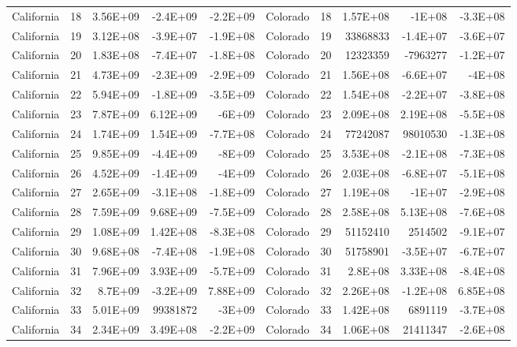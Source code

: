 \begin{table}[]
\begin{tabular}{lrrrrlrrrr}
		California &  18 & 3.56E+09 & -2.4E+09 & -2.2E+09 & Colorado &  18 & 1.57E+08 & -1E+08 & -3.3E+08 \\
		California &  19 & 3.12E+08 & -3.9E+07 & -1.9E+08 & Colorado &  19 & 33868833 & -1.4E+07 & -3.6E+07 \\
		California &  20 & 1.83E+08 & -7.4E+07 & -1.8E+08 & Colorado &  20 & 12323359 & -7963277 & -1.2E+07 \\
		California &  21 & 4.73E+09 & -2.3E+09 & -2.9E+09 & Colorado &  21 & 1.56E+08 & -6.6E+07 & -4E+08 \\
		California &  22 & 5.94E+09 & -1.8E+09 & -3.5E+09 & Colorado &  22 & 1.54E+08 & -2.2E+07 & -3.8E+08 \\
		California &  23 & 7.87E+09 & 6.12E+09 & -6E+09 & Colorado &  23 & 2.09E+08 & 2.19E+08 & -5.5E+08 \\
		California &  24 & 1.74E+09 & 1.54E+09 & -7.7E+08 & Colorado &  24 & 77242087 & 98010530 & -1.3E+08 \\
		California &  25 & 9.85E+09 & -4.4E+09 & -8E+09 & Colorado &  25 & 3.53E+08 & -2.1E+08 & -7.3E+08 \\
		California &  26 & 4.52E+09 & -1.4E+09 & -4E+09 & Colorado &  26 & 2.03E+08 & -6.8E+07 & -5.1E+08 \\
		California &  27 & 2.65E+09 & -3.1E+08 & -1.8E+09 & Colorado &  27 & 1.19E+08 & -1E+07 & -2.9E+08 \\
		California &  28 & 7.59E+09 & 9.68E+09 & -7.5E+09 & Colorado &  28 & 2.58E+08 & 5.13E+08 & -7.6E+08 \\
		California &  29 & 1.08E+09 & 1.42E+08 & -8.3E+08 & Colorado &  29 & 51152410 & 2514502 & -9.1E+07 \\
		California &  30 & 9.68E+08 & -7.4E+08 & -1.9E+08 & Colorado &  30 & 51758901 & -3.5E+07 & -6.7E+07 \\
		California &  31 & 7.96E+09 & 3.93E+09 & -5.7E+09 & Colorado &  31 & 2.8E+08 & 3.33E+08 & -8.4E+08 \\
		California &  32 & 8.7E+09 & -3.2E+09 & 7.88E+09 & Colorado &  32 & 2.26E+08 & -1.2E+08 & 6.85E+08 \\
		California &  33 & 5.01E+09 & 99381872 & -3E+09 & Colorado &  33 & 1.42E+08 & 6891119 & -3.7E+08 \\
		California &  34 & 2.34E+09 & 3.49E+08 & -2.2E+09 & Colorado &  34 & 1.06E+08 & 21411347 & -2.6E+08
	\end{tabular}
\end{table}

